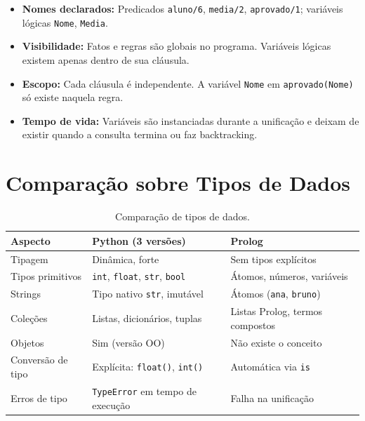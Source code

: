\documentclass[12pt, a4paper]{article}
\begin{document}
\begin{itemize}
    \item \textbf{Nomes declarados:} Predicados \texttt{aluno/6}, \texttt{media/2}, \texttt{aprovado/1}; variáveis lógicas \texttt{Nome}, \texttt{Media}.
    \item \textbf{Visibilidade:} Fatos e regras são globais no programa. Variáveis lógicas existem apenas dentro de sua cláusula.
    \item \textbf{Escopo:} Cada cláusula é independente. A variável \texttt{Nome} em \texttt{aprovado(Nome)} só existe naquela regra.
    \item \textbf{Tempo de vida:} Variáveis são instanciadas durante a unificação e deixam de existir quando a consulta termina ou faz backtracking.
\end{itemize}

\section{Comparação sobre Tipos de Dados}

\begin{table}[h]
\centering
\begin{tabularx}{\textwidth}{lXX}
\toprule
\textbf{Aspecto} & \textbf{Python (3 versões)} & \textbf{Prolog} \\
\midrule
Tipagem & Dinâmica, forte & Sem tipos explícitos \\
\addlinespace
Tipos primitivos & \texttt{int}, \texttt{float}, \texttt{str}, \texttt{bool} & Átomos, números, variáveis \\
\addlinespace
Strings & Tipo nativo \texttt{str}, imutável & Átomos (\texttt{ana}, \texttt{bruno}) \\
\addlinespace
Coleções & Listas, dicionários, tuplas & Listas Prolog, termos compostos \\
\addlinespace
Objetos & Sim (versão OO) & Não existe o conceito \\
\addlinespace
Conversão de tipo & Explícita: \texttt{float()}, \texttt{int()} & Automática via \texttt{is} \\
\addlinespace
Erros de tipo & \texttt{TypeError} em tempo de execução & Falha na unificação \\
\bottomrule
\end{tabularx}
\caption{Comparação de tipos de dados.}
\end{table}
\end{document}
